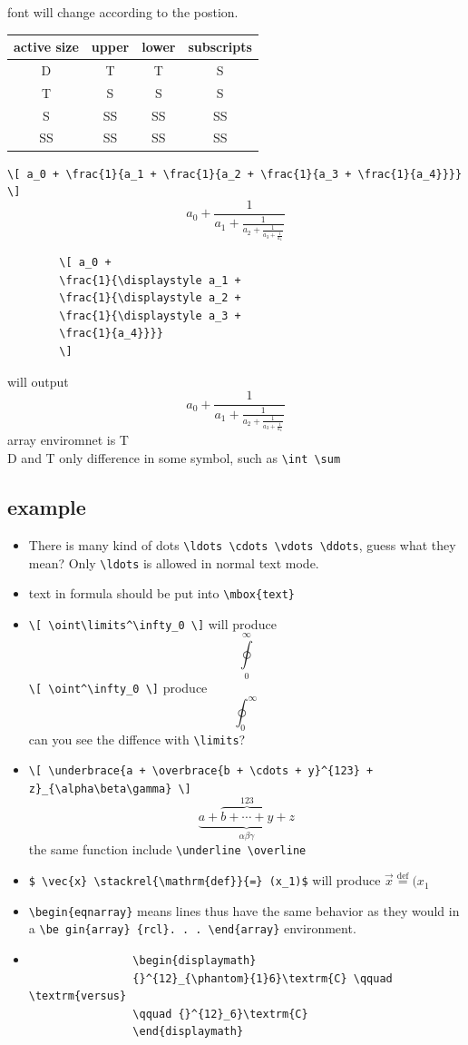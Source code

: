\documentclass[a4paper,12pt,twoside]{book}
\begin{document}
\begin{CJK*}{UTF8}{song}
		font will change according to the postion. \\
		\begin{tabular}{|c|c|c|c|}
		\hline active size & upper & lower & subscripts\\
		\hline D & T & T & S\\
		\hline T & S & S & S\\
		\hline S & SS & SS & SS\\
		\hline SS & SS & SS & SS\\
		\hline
		\end{tabular}

		\verb=\[ a_0 + \frac{1}{a_1 + \frac{1}{a_2 + \frac{1}{a_3 + \frac{1}{a_4}}}} \]=
		\[ a_0 + \frac{1}{a_1 + \frac{1}{a_2 + \frac{1}{a_3 + \frac{1}{a_4}}}} \]

		\begin{verbatim}
		\[ a_0 +
		\frac{1}{\displaystyle a_1 +
		\frac{1}{\displaystyle a_2 +
		\frac{1}{\displaystyle a_3 +
		\frac{1}{a_4}}}}
		\]
		\end{verbatim}
		will output
		\[ a_0 +
		\frac{1}{\displaystyle a_1 +
		\frac{1}{\displaystyle a_2 +
		\frac{1}{\displaystyle a_3 +
		\frac{1}{a_4}}}}
		\]
		array enviromnet is T \\
		D and T only difference in some symbol, such as \verb=\int \sum= \\
		\subsection{example}
			\begin{itemize}
			\item There is many kind of dots \verb=\ldots \cdots \vdots \ddots=, guess what they mean? Only \verb=\ldots= is allowed in normal text mode.
			\item text in formula should be put into \verb=\mbox{text}=
			\item \verb=\[ \oint\limits^\infty_0 \]= will produce \[ \oint\limits^\infty_0 \]
				\verb=\[ \oint^\infty_0 \]= produce \[ \oint^\infty_0 \]
				can you see the diffence with \verb=\limits=?
			\item \verb=\[ \underbrace{a + \overbrace{b + \cdots + y}^{123} + z}_{\alpha\beta\gamma} \]=
				\[ \underbrace{a + \overbrace{b + \cdots + y}^{123} + z}_{\alpha\beta\gamma} \]
				the same function include \verb=\underline \overline=
			\item  \verb!$ \vec{x} \stackrel{\mathrm{def}}{=} (x_1)$! will produce
				$ \vec{x} \stackrel{\mathrm{def}}{=} (x_1$
			\item  \verb=\begin{eqnarray}= means lines thus have the same behavior as they would in a \verb=\be gin{array} {rcl}. . . \end{array}= environment.
			\item
				\begin{verbatim}
				\begin{displaymath}
				{}^{12}_{\phantom}{1}6}\textrm{C} \qquad \textrm{versus}
				\qquad {}^{12}_6}\textrm{C}
				\end{displaymath}
				\end{verbatim}
				

\end{itemize}
\end{CJK*}
\end{document}
